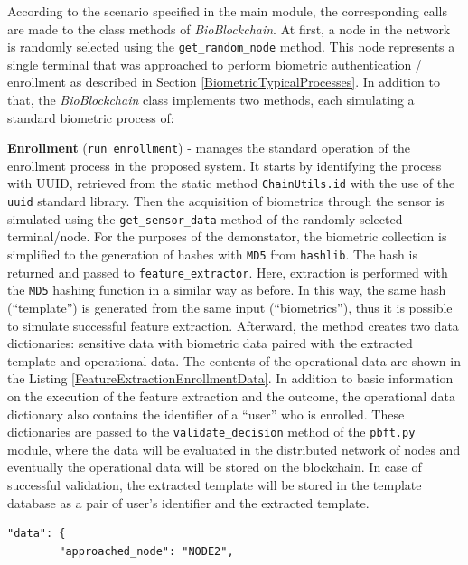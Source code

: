 According to the scenario specified in the main module, the corresponding calls are made to the class methods of \emph{BioBlockchain}. At first, a node in the network is randomly selected using the \texttt{get\_random\_node} method. This node represents a single terminal that was approached to perform biometric authentication / enrollment as described in Section \ref{BiometricTypicalProcesses}. In addition to that, the \emph{BioBlockchain} class implements two methods, each simulating a standard biometric process of:
\begin{description}
    \item \textbf{Enrollment} (\texttt{run\_enrollment}) - manages the standard operation of the enrollment process in the proposed system. It starts by identifying the process with UUID, retrieved from the static method \texttt{ChainUtils.id} with the use of the \texttt{uuid} standard library. Then the acquisition of biometrics through the sensor is simulated using the \texttt{get\_sensor\_data} method of the randomly selected terminal/node. For the purposes of the demonstator, the biometric collection is simplified to the generation of hashes with \texttt{MD5} from \texttt{hashlib}. The hash is returned and passed to \texttt{feature\_extractor}. Here, extraction is performed with the \texttt{MD5} hashing function in a similar way as before. In this way, the same hash (``template'') is generated from the same input (``biometrics''), thus it is possible to simulate successful feature extraction. Afterward, the method creates two data dictionaries: sensitive data with biometric data paired with the extracted template and operational data. The contents of the operational data are shown in the Listing \ref{FeatureExtractionEnrollmentData}. In addition to basic information on the execution of the feature extraction and the outcome, the operational data dictionary also contains the identifier of a ``user'' who is enrolled. These dictionaries are passed to the \texttt{validate\_decision} method of the \texttt{pbft.py} module, where the data will be evaluated in the distributed network of nodes and eventually the operational data will be stored on the blockchain. In case of successful validation, the extracted template will be stored in the template database as a pair of user's identifier and the extracted template.
    \begin{lstlisting}[frame=single,breaklines=true, caption={Transaction data of feature extraction in enrollment.},captionpos=b, label={FeatureExtractionEnrollmentData}]
     "data": {
        "approached_node": "NODE2",

\end{lstlisting}
\end{description}
